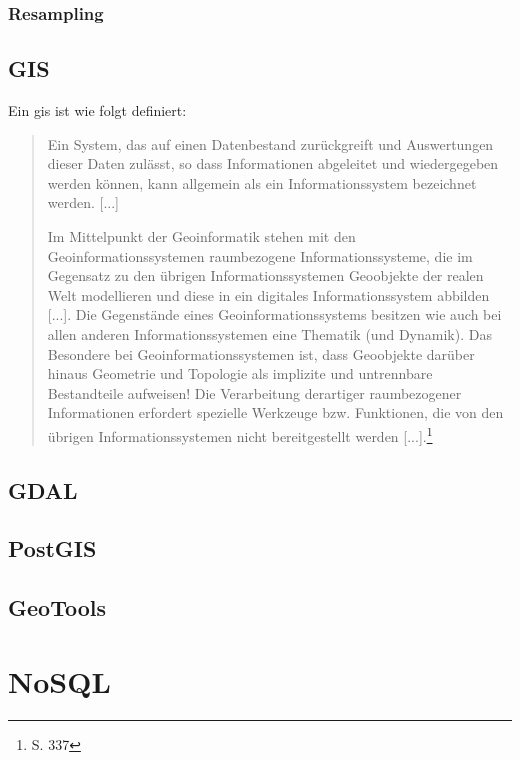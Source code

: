 \subsubsection{Resampling}


\subsection{GIS}
\label{grundlagen:gis}

Ein \Gls{gis} ist wie folgt definiert:
\begin{quote}
Ein System,  das  auf einen Datenbestand zurückgreift und Auswertungen dieser Daten zulässt,  so dass Informationen abgeleitet und wiedergegeben werden können,  kann  allgemein  als  ein  Informationssystem  bezeichnet  werden. [...]

Im Mittelpunkt  der  Geoinformatik  stehen  mit den  Geoinformationssystemen raumbezogene Informationssysteme, die im Gegensatz zu den übrigen Informationssystemen Geoobjekte  der realen Welt modellieren und diese in ein digitales Informationssystem abbilden [...]. Die Gegenstände eines Geoinformationssystems  besitzen  wie  auch  bei  allen  anderen  Informationssystemen  eine 
Thematik (und Dynamik). Das Besondere bei Geoinformationssystemen ist, dass Geoobjekte darüber hinaus Geometrie und Topologie als implizite und untrennbare Bestandteile aufweisen!  Die Verarbeitung derartiger raumbezogener Informationen erfordert spezielle Werkzeuge bzw. Funktionen, die von den übrigen Informationssystemen nicht bereitgestellt werden [...].\footnote{\cite{book:gi-theopluspraxis3} S. 337}
\end{quote}

\subsection{GDAL}

\subsection{PostGIS}

\subsection{GeoTools}



\section{NoSQL}

